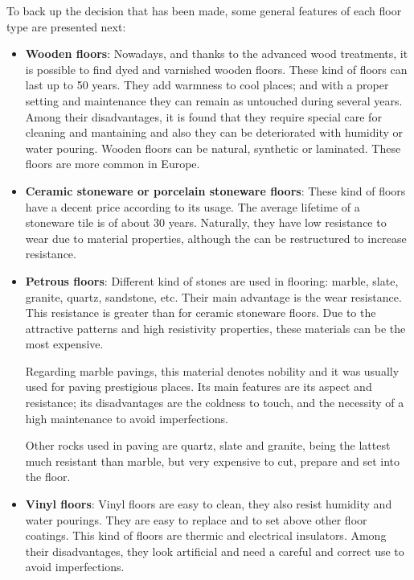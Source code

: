 	To back up the decision that has been made, some general features of each floor type are presented next:
	
	\begin{itemize}
	\item \textbf{Wooden floors}: 
	Nowadays, and thanks to the advanced wood treatments, it is possible to find dyed and varnished wooden floors. These kind of floors can last up to 50 years. They add warmness to cool places; and with a proper setting and maintenance they can remain as untouched during several years. Among their disadvantages, it is found that they require special care for cleaning and mantaining and also they can be deteriorated with humidity or water pouring. Wooden floors can be natural, synthetic or laminated. These floors are more common in Europe.
	
	\item \textbf{Ceramic stoneware or porcelain stoneware floors}:
	These kind of floors have a decent price according to its usage. The average lifetime of a stoneware tile is of about 30 years. Naturally, they have low resistance to wear due to material properties, although the can be restructured to increase resistance.
	
	\item \textbf{Petrous floors}: 
	Different kind of stones are used in flooring: marble, slate, granite, quartz, sandstone, etc. Their main advantage is the wear resistance. This resistance is greater than for ceramic stoneware floors. Due to the attractive patterns and high resistivity properties, these materials can be the most expensive.
	
	Regarding marble pavings, this material denotes nobility and it was usually used for paving prestigious places. Its main features are its aspect and resistance; its disadvantages are the coldness to touch, and the necessity of a high maintenance to avoid imperfections.
	
	Other rocks used in paving are quartz, slate and granite, being the lattest much resistant than marble, but very expensive to cut, prepare and set into the floor.
	
	\item \textbf{Vinyl floors}:
	Vinyl floors are easy to clean, they also resist humidity and water pourings. They are easy to replace and to set above other floor coatings. This kind of floors are thermic and electrical insulators. Among their disadvantages, they look artificial and need a careful and correct use to avoid imperfections.
	

\end{itemize}
